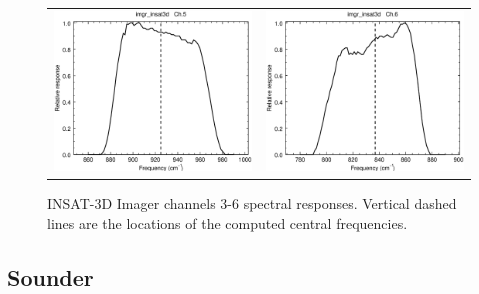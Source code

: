 \begin{figure}[H]
\begin{tabular}{c c}
    \includegraphics[scale=0.35]{graphics/imgr/srf/imgr_insat3d-5.eps} &
    \includegraphics[scale=0.35]{graphics/imgr/srf/imgr_insat3d-6.eps}
  \end{tabular}
  \caption{INSAT-3D Imager channels 3-6 spectral responses. Vertical dashed lines are the locations of the computed central frequencies.}
  \label{fig:imgr_ch3-6}
\end{figure}


\subsection{Sounder}

